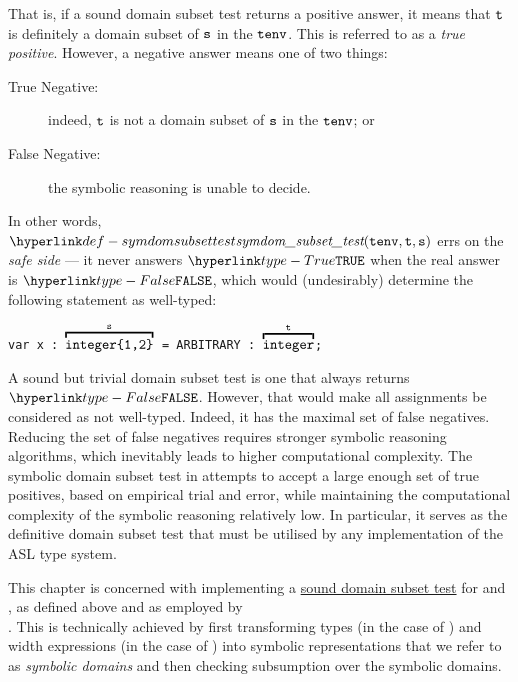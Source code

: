 That is, if a sound domain subset test returns a positive answer, it means that
$\texttt{t}$ is definitely a domain subset of $\texttt{s}$ in the \staticenvironmentterm{} $\texttt{tenv}$.
This is referred to as a \emph{true positive}.
However, a negative answer means one of two things:
\begin{description}
  \item[True Negative:] indeed, $\texttt{t}$ is not a domain subset of $\texttt{s}$ in the \staticenvironmentterm{} $\texttt{tenv}$; or
  \item[False Negative:] the symbolic reasoning is unable to decide.
\end{description}

In other words, $\symdomsubsettest(\tenv, \vt, \vs)$ errs on the \emph{safe side} ---
it never answers $\True$ when the real answer is $\False$, which would (undesirably)
determine the following statement as well-typed:
\begin{center}
\texttt{var x : $\overname{\texttt{integer\{1,2\}}}{\vs}$ = ARBITRARY : $\overname{\texttt{integer}}{\vt}$;}
\end{center}

A sound but trivial domain subset test is one that always returns $\False$.
However, that would make all assignments be considered as not well-typed.
Indeed, it has the maximal set of false negatives.
Reducing the set of false negatives requires stronger symbolic reasoning algorithms,
which inevitably leads to higher computational complexity.
%
The symbolic domain subset test in 
attempts to accept a large enough set of true positives, based on empirical trial and error,
while maintaining the computational complexity of the symbolic reasoning relatively low.
%
In particular, it serves as the definitive domain subset test that must be utilised
by any implementation of the ASL type system.

This chapter is concerned with implementing a \hyperlink{def-symdomsubsettest}{sound domain subset test}
for \integertypesterm{} and \bitvectortypesterm, as defined above and as employed by \\
.
This is technically achieved by first transforming types (in the case of \integertypesterm{})
and width expressions (in the case of \bitvectortypesterm{}) into symbolic representations
that we refer to as \emph{symbolic domains} and then checking subsumption over the symbolic domains.

\ChapterOutline

\hypertarget{def-symbolicdomain}{}

